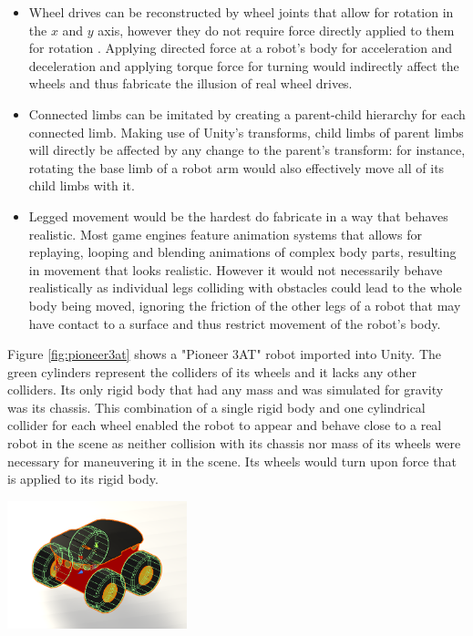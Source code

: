 \begin{itemize}
    \item Wheel drives can be reconstructed by wheel joints that allow for rotation in the $x$ and $y$ axis, however they do not require force directly applied to them for rotation . Applying directed force at a robot's body for acceleration and deceleration and applying torque force for turning would indirectly affect the wheels and thus fabricate the illusion of real wheel drives. 
    \item Connected limbs can be imitated by creating a parent-child hierarchy for each connected limb. Making use of Unity's transforms, child limbs of parent limbs will directly be affected by any change to the parent's transform: for instance, rotating the base limb of a robot arm would also effectively move all of its child limbs with it.
    \item Legged movement would be the hardest do fabricate in a way that behaves realistic. Most game engines feature animation systems that allows for replaying, looping and blending animations of complex body parts, resulting in movement that looks realistic. However it would not necessarily behave realistically as individual legs colliding with obstacles could lead to the whole body being moved, ignoring the friction of the other legs of a robot that may have contact to a surface and thus restrict movement of the robot's body.
\end{itemize}

Figure \ref{fig:pioneer3at} shows a "Pioneer 3AT" robot imported into Unity. The green cylinders represent the colliders of its wheels and it lacks any other colliders. Its only rigid body that had any mass and was simulated for gravity was its chassis. This combination of a single rigid body and one cylindrical collider for each wheel enabled the robot to appear and behave close to a real robot in the scene as neither collision with its chassis nor mass of its wheels were necessary for maneuvering it in the scene. Its wheels would turn upon force that is applied to its rigid body.

\begin{center}
    \includegraphics[width=0.39\textwidth]{tex/img/ch05/Pioneer3AT.png}
    \label{fig:pioneer3at}
\end{center}

